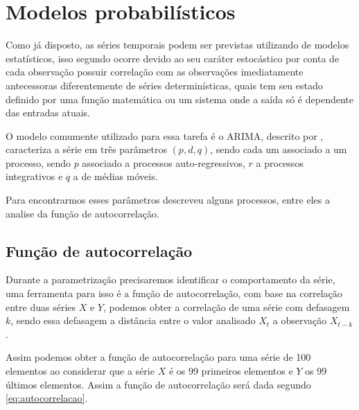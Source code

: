 \documentclass[
    12pt,
    oneside,
    a4paper,
    english,
    brazil
]{abntex2}
\begin{document}


\section{Modelos probabilísticos}

Como já disposto, as séries temporais podem ser previstas utilizando de modelos
estatísticos, isso segundo  ocorre devido ao seu caráter
estocástico por conta de cada observação possuir correlação com as observações
imediatamente antecessoras diferentemente de séries determinísticas, quais tem
seu estado definido por uma função matemática ou um sistema onde a saída só é
dependente das entradas atuais.

O modelo comumente utilizado para essa tarefa é o ARIMA, descrito por
, caracteriza a série em três parâmetros $(p,d,q)$, sendo cada
um associado a um processo, sendo $p$ associado a processos auto-regressivos,
$r$ a processos integrativos e $q$ a de médias móveis.

Para encontrarmos esses parâmetros  descreveu alguns processos,
entre eles a analise da função de autocorrelação.

\subsection{Função de autocorrelação}\label{sec:corre}

Durante a parametrização precisaremos identificar o comportamento da série, uma
ferramenta para isso é a função de autocorrelação, com base na correlação entre
duas séries $X$ e $Y$, podemos obter a correlação de uma série com defasagem
$k$, sendo essa defasagem a distância entre o valor analisado $X_t$ a
observação $X_{t-k}$.

Assim podemos obter a função de autocorrelação para uma série de 100 elementos
ao considerar que a série $X$ é os 99 primeiros elementos e $Y$ os 99 últimos
elementos. Assim a função de autocorrelação será dada segundo
\autoref{eq:autocorrelacao}.
\end{document}
